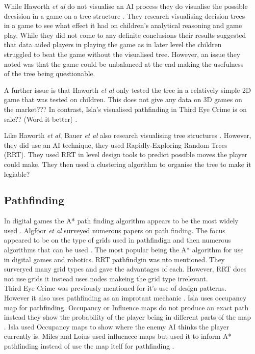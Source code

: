 \documentclass[journal]{IEEEtran}
\begin{document}
While Haworth \textit{et al} do not visualise an AI process they do visualise the possible decsision in a game on a tree structure \cite{Haworth2010}. They research visualising decision trees in a game to see what effect it had on children's analytical reasoning and game play.  While they did not come to any definite conclusions their results suggested that data aided players in playing the game as in later level the children struggled to beat the game without the visualised tree. However, an issue they noted was that the game could be unbalanced at the end making the usefulness of the tree being questionable.  

A further issue is that Haworth \textit{et al} only tested the tree in a relatively simple 2D game that was tested on children. This does not give any data on 3D games on the market??? In contrast, Isla's visualised pathfinding in Third Eye Crime is on sale?? (Word it better) \cite{Isla2014}.
 
Like  Haworth \textit{et al}, Bauer \textit{et al} also research visualising tree structures \cite{bauer2012}. However, they did use an AI technique, they used Rapidly-Exploring Random Trees (RRT). They used RRT in level design tools to predict possible moves the player could make.  They then used a clustering algorithm to organise the tree to make it legiable? 

 


\subsection{Pathfinding}
In digital games the A* path finding algorithm appears to be the most widely used \cite{Algfoor2015}.  Algfoor \textit{et al} surveyed numerous papers on path finding. The focus appeared to be on the type of grids used in pathfindign and then numerous algorithms that can be used \cite{Algfoor2015}. The most popular being the A* algorithm for use in digital games and robotics. RRT pathfindgin was nto mentioned. 
They surveryed many grid types and gave the advantages of each. However, RRT does not use grids it instead uses nodes makeing the grid type irrelevant.\\

Third Eye Crime was previously mentioned for it's use of design patterns. However it also uses pathfinding as an improtant mechanic \cite{Isla2014}. Isla uses occupancy map for pathfinding. Occupancy or Influence maps do not produce an exact path instead they show the probability of the player being in different parts of the map \cite{Isla2014, Miles2006}. Isla used Occupancy maps to show where the enemy AI thinks the player currently is. Miles and Loius used influcnece maps but used it to inform A* pathfinding instead of use the map itelf for pathfinding \cite{Miles2006}.\\
 
\end{document}
